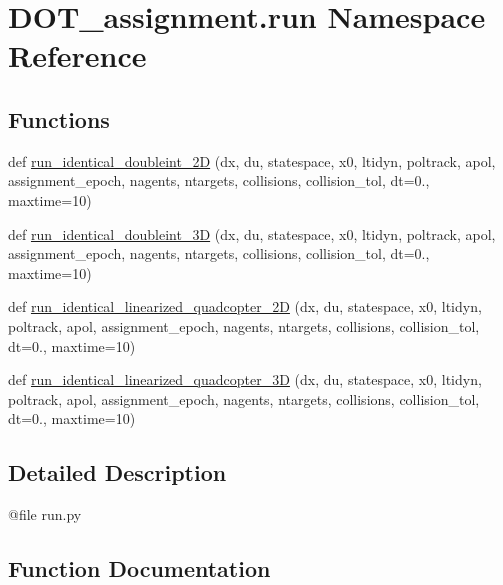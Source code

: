 \hypertarget{namespace_d_o_t__assignment_1_1run}{}\section{D\+O\+T\+\_\+assignment.\+run Namespace Reference}
\label{namespace_d_o_t__assignment_1_1run}
\subsection*{Functions}
\begin{DoxyCompactItemize}
\item 
def \mbox{\hyperlink{namespace_d_o_t__assignment_1_1run_ad2a4db4a40619bcf8f16e52cfb8b4bd6}{run\+\_\+identical\+\_\+doubleint\+\_\+2D}} (dx, du, statespace, x0, ltidyn, poltrack, apol, assignment\+\_\+epoch, nagents, ntargets, collisions, collision\+\_\+tol, dt=0., maxtime=10)
\item 
def \mbox{\hyperlink{namespace_d_o_t__assignment_1_1run_abbf8223c20f4b28e56f84875d66b8a52}{run\+\_\+identical\+\_\+doubleint\+\_\+3D}} (dx, du, statespace, x0, ltidyn, poltrack, apol, assignment\+\_\+epoch, nagents, ntargets, collisions, collision\+\_\+tol, dt=0., maxtime=10)
\item 
def \mbox{\hyperlink{namespace_d_o_t__assignment_1_1run_aa2c67e214eb5e95cc9fb3a874c49da05}{run\+\_\+identical\+\_\+linearized\+\_\+quadcopter\+\_\+2D}} (dx, du, statespace, x0, ltidyn, poltrack, apol, assignment\+\_\+epoch, nagents, ntargets, collisions, collision\+\_\+tol, dt=0., maxtime=10)
\item 
def \mbox{\hyperlink{namespace_d_o_t__assignment_1_1run_ab24ec46198cb710a165623079674d8b2}{run\+\_\+identical\+\_\+linearized\+\_\+quadcopter\+\_\+3D}} (dx, du, statespace, x0, ltidyn, poltrack, apol, assignment\+\_\+epoch, nagents, ntargets, collisions, collision\+\_\+tol, dt=0., maxtime=10)
\end{DoxyCompactItemize}


\subsection{Detailed Description}
\begin{DoxyVerb}@file run.py
\end{DoxyVerb}
 

\subsection{Function Documentation}
\mbox{\label{namespace_d_o_t__assignment_1_1run_ad2a4db4a40619bcf8f16e52cfb8b4bd6}} 
